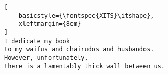 
\cleardoublepage
\thispagestyle{empty}


\begin{lstlisting}[
    basicstyle={\fontspec{XITS}\itshape},
    xleftmargin={8em}
]
I dedicate my book
to my waifus and chairudos and husbandos.
However, unfortunately,
there is a lamentably thick wall between us.
\end{lstlisting}


\clearpage
\mbox{}%
\thispagestyle{empty}

\cleardoublepage
